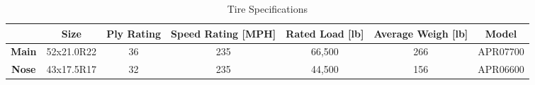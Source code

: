 \begin{table}[!h]
    \centering
        \caption{Tire Specifications}
    \begin{tabular}{|c||c|c|c|c|c|c|}\toprule
         & \textbf{Size} & \textbf{Ply Rating} & \textbf{Speed Rating [MPH]} & \textbf{Rated Load [lb]} & \textbf{Average Weigh [lb]} & \textbf{Model} \\\hline \hline
         \textbf{Main} & 52x21.0R22 & 36 & 235 & 66,500 & 266 & APR07700 \\ \hline
         \textbf{Nose} & 43x17.5R17 & 32 & 235 & 44,500 & 156 & APR06600 \\ \hline
    \end{tabular}
    \label{tab:tires}
\end{table}


